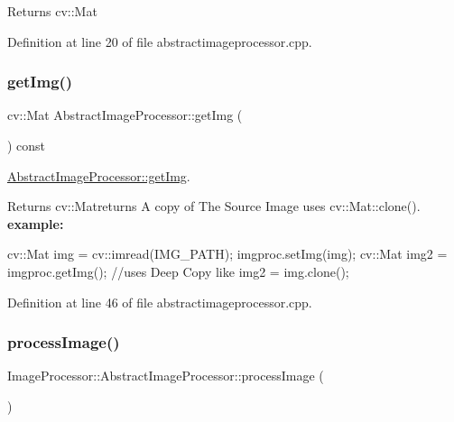 \begin{DoxyReturn}{Returns}
cv\+::\+Mat 
\end{DoxyReturn}


Definition at line 20 of file abstractimageprocessor.\+cpp.

\mbox{\label{class_image_processor_1_1_abstract_image_processor_a904d1619b2c6be2c5382469325ca43e3}} 
\subsubsection{\texorpdfstring{get\+Img()}{getImg()}}
{\footnotesize\ttfamily cv\+::\+Mat Abstract\+Image\+Processor\+::get\+Img (\begin{DoxyParamCaption}{ }\end{DoxyParamCaption}) const}



\hyperlink{class_image_processor_1_1_abstract_image_processor_a904d1619b2c6be2c5382469325ca43e3}{Abstract\+Image\+Processor\+::get\+Img}. 

\begin{DoxyReturn}{Returns}
cv\+::\+Matreturns A copy of The Source Image uses cv\+::\+Mat\+::clone(). {\bfseries example\+:} 
\begin{DoxyCode}
cv::Mat img = cv::imread(IMG\_PATH);
imgproc.setImg(img);
cv::Mat img2 = imgproc.getImg(); \textcolor{comment}{//uses Deep Copy like img2 = img.clone();}
\end{DoxyCode}
 
\end{DoxyReturn}


Definition at line 46 of file abstractimageprocessor.\+cpp.

\mbox{\label{class_image_processor_1_1_abstract_image_processor_ad033ae911918b0f6842b7b1d6cdd2b90}} 
\subsubsection{\texorpdfstring{process\+Image()}{processImage()}}
{\footnotesize\ttfamily Image\+Processor\+::\+Abstract\+Image\+Processor\+::process\+Image (\begin{DoxyParamCaption}{ }\end{DoxyParamCaption})\hspace{0.3cm}{\ttfamily [pure virtual]}}



